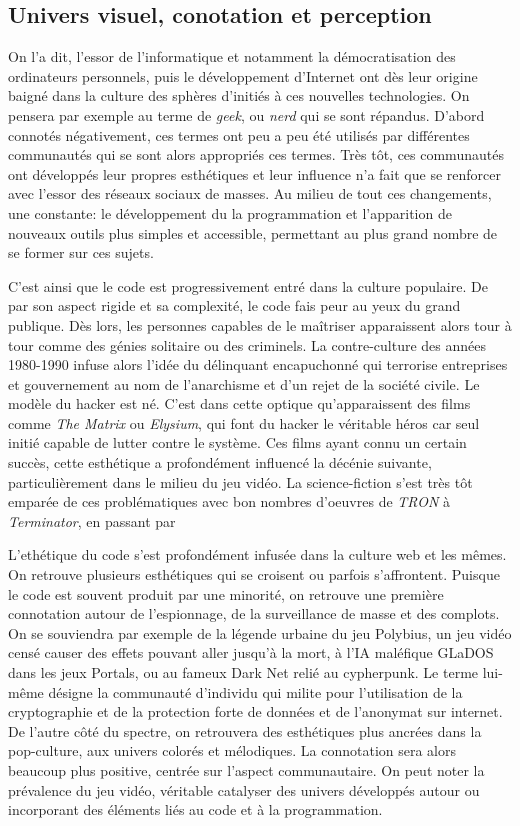 \documentclass[12pt]{article} %
\begin{document}
\subsection{Univers visuel, conotation et perception}
On l'a dit, l'essor de l'informatique et notamment la démocratisation des ordinateurs personnels, puis le développement d'Internet ont dès leur origine baigné dans la culture des sphères d'initiés à ces nouvelles technologies. On pensera par exemple au terme de \textit{geek}, ou \textit{nerd} qui se sont répandus. D'abord connotés négativement, ces termes ont peu a peu été utilisés par différentes communautés qui se sont alors appropriés ces termes. Très tôt, ces communautés ont développés leur propres esthétiques et leur influence n'a fait que se renforcer avec l'essor des réseaux sociaux de masses. Au milieu de tout ces changements, une constante: le développement du la programmation et l'apparition de nouveaux outils plus simples et accessible, permettant au plus grand nombre de se former sur ces sujets.

C'est ainsi que le code est progressivement entré dans la culture populaire. De par son aspect rigide et sa complexité, le code fais peur au yeux du grand publique. Dès lors, les personnes capables de le maîtriser apparaissent alors tour à tour comme des génies solitaire ou des criminels. La contre-culture des années 1980-1990 infuse alors l'idée du délinquant encapuchonné qui terrorise entreprises et gouvernement au nom de l'anarchisme et d'un rejet de la société civile. Le modèle du hacker est né. C'est dans cette optique qu'apparaissent des films comme \textit{The Matrix} ou \textit{Elysium}, qui font du hacker le véritable héros car seul initié capable de lutter contre le système. Ces films ayant connu un certain succès, cette esthétique a profondément influencé la décénie suivante, particulièrement dans le milieu du jeu vidéo. La science-fiction s'est très tôt emparée de ces problématiques avec bon nombres d'oeuvres de \textit{TRON} à \textit{Terminator}, en passant par 

L'ethétique du code s'est profondément infusée dans la culture web et les mêmes. On retrouve plusieurs esthétiques qui se croisent ou parfois s'affrontent. Puisque le code est souvent produit par une minorité, on retrouve une première connotation autour de l'espionnage, de la surveillance de masse et des complots. On se souviendra par exemple de la légende urbaine du jeu Polybius, un jeu vidéo censé causer des effets pouvant aller jusqu'à la mort, à l'IA maléfique GLaDOS dans les jeux Portals, ou au fameux Dark Net relié au cypherpunk. Le terme lui-même désigne la communauté d'individu qui milite pour l'utilisation de la cryptographie et de la protection forte de données et de l'anonymat sur internet. De l'autre côté du spectre, on retrouvera des esthétiques plus ancrées dans la pop-culture, aux univers colorés et mélodiques. La connotation sera alors beaucoup plus positive, centrée sur l'aspect communautaire. On peut noter la prévalence du jeu vidéo, véritable catalyser des univers développés autour ou incorporant des éléments liés au code et à la programmation.
\end{document}
